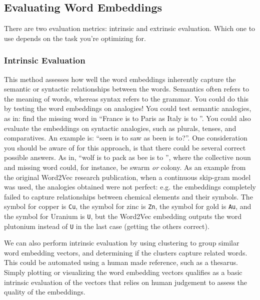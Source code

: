 \documentclass[12pt]{article}
\begin{document}
\subsection{Evaluating Word Embeddings}
There are two evaluation metrics: intrinsic and extrinsic evaluation. Which one to use depends on the task you're optimizing for.

\subsubsection{Intrinsic Evaluation} This method assesses how well the word embeddings inherently capture the semantic or syntactic relationships between the words. Semantics often refers to the meaning of words, whereas syntax refers to the grammar. You could do this by testing the word embeddings on analogies! You could test semantic analogies, as in: find the missing word in ``France is to Paris as Italy is to \uline{\hspace{10pt}}''. You could also evaluate the embeddings on syntactic analogies, such as plurals, tenses, and comparatives. An example is: ``seen is to saw as been is to?''. One consideration you should be aware of for this approach, is that there could be several correct possible answers. As in, ``wolf is to pack as bee is to \uline{\hspace{10pt}}'', where the collective noun and missing word could, for instance, be swarm \emph{or} colony. As an example from the original Word2Vec research publication, when a continuous skip-gram model was used, the analogies obtained were not perfect: e.g. the embeddings completely failed to capture relationships between chemical elements and their symbols. The symbol for copper is \texttt{Cu}, the symbol for zinc is \texttt{Zn}, the symbol for gold is \texttt{Au}, and the symbol for Uranium is \texttt{U}, but the Word2Vec embedding outputs the word plutonium instead of \texttt{U} in the last case (getting the others correct).

We can also perform intrinsic evaluation by using clustering to group similar word embedding vectors, and determining if the clusters capture related words. This could be automated using a human made reference, such as a thesarus. Simply plotting or visualizing the word embedding vectors qualifies as a basic intrinsic evaluation of the vectors that relies on human judgement to assess the quality of the embeddings.
\end{document}
